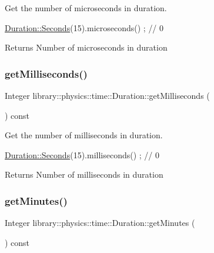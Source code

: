 Get the number of microseconds in duration. 


\begin{DoxyCode}
\hyperlink{classlibrary_1_1physics_1_1time_1_1_duration_ae10891c94a1b2278c444cb44b37132f1}{Duration::Seconds}(15).microseconds() ; \textcolor{comment}{// 0}
\end{DoxyCode}


\begin{DoxyReturn}{Returns}
Number of microseconds in duration 
\end{DoxyReturn}
\mbox{\label{classlibrary_1_1physics_1_1time_1_1_duration_aac5063bb791db96348e23784106a4eba}} 
\subsubsection{\texorpdfstring{get\+Milliseconds()}{getMilliseconds()}}
{\footnotesize\ttfamily Integer library\+::physics\+::time\+::\+Duration\+::get\+Milliseconds (\begin{DoxyParamCaption}{ }\end{DoxyParamCaption}) const}



Get the number of milliseconds in duration. 


\begin{DoxyCode}
\hyperlink{classlibrary_1_1physics_1_1time_1_1_duration_ae10891c94a1b2278c444cb44b37132f1}{Duration::Seconds}(15).milliseconds() ; \textcolor{comment}{// 0}
\end{DoxyCode}


\begin{DoxyReturn}{Returns}
Number of milliseconds in duration 
\end{DoxyReturn}
\mbox{\label{classlibrary_1_1physics_1_1time_1_1_duration_a2c8a5767f1a0add4999c649001cdb838}} 
\subsubsection{\texorpdfstring{get\+Minutes()}{getMinutes()}}
{\footnotesize\ttfamily Integer library\+::physics\+::time\+::\+Duration\+::get\+Minutes (\begin{DoxyParamCaption}{ }\end{DoxyParamCaption}) const}



